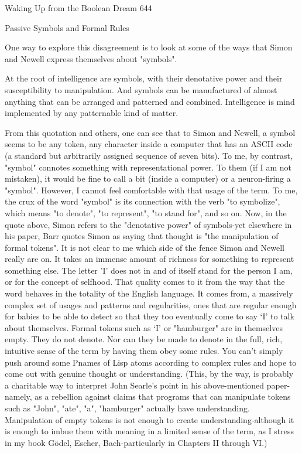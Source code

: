 Waking Up from the Boolean Dream                                                      644

                          Passive Symbols and Formal Rules

      One way to explore this disagreement is to look at some of the ways that
Simon and Newell express themselves about "symbols".

   At the root of intelligence are symbols, with their denotative power and their
   susceptibility to manipulation. And symbols can be manufactured of almost
   anything that can be arranged and patterned and combined. Intelligence is mind
   implemented by any patternable kind of matter.

        From this quotation and others, one can see that to Simon and Newell, a
symbol seems to be any token, any character inside a computer that has an ASCII
code (a standard but arbitrarily assigned sequence of seven bits). To me, by contrast,
"symbol" connotes something with representational power. To them (if I am not
mistaken), it would be fine to call a bit (inside a computer) or a neuron-firing a
"symbol". However, I cannot feel comfortable with that usage of the term.
        To me, the crux of the word "symbol" is its connection with the verb "to
symbolize", which means "to denote", "to represent", "to stand for", and so on. Now,
in the quote above, Simon refers to the "denotative power" of symbols-yet elsewhere
in his paper, Barr quotes Simon as saying that thought is "the manipulation of formal
tokens". It is not clear to me which side of the fence Simon and Newell really are on.
        It takes an immense amount of richness for something to represent something
else. The letter 'I' does not in and of itself stand for the person I am, or for the concept
of selfhood. That quality comes to it from the way that the word behaves in the
totality of the English language. It comes from, a massively complex set of usages and
patterns and regularities, ones that are regular enough for babies to be able to detect so
that they too eventually come to say `I' to talk about themselves.
        Formal tokens such as `I' or "hamburger" are in themselves empty. They do
not denote. Nor can they be made to denote in the full, rich, intuitive sense of the term
by having them obey some rules. You can't simply push around some Pnames of Lisp
atoms according to complex rules and hope to come out with genuine thought or
understanding. (This, by the way, is probably a charitable way to interpret John
Searle's point in his above-mentioned paper-namely, as a rebellion against claims that
programs that can manipulate tokens such as "John", "ate", "a", "hamburger" actually
have understanding. Manipulation of empty tokens is not enough to create
understanding-although it is enough to imbue them with meaning in a limited sense of
the term, as I stress in my book Gödel, Escher, Bach-particularly in Chapters II
through VI.)




